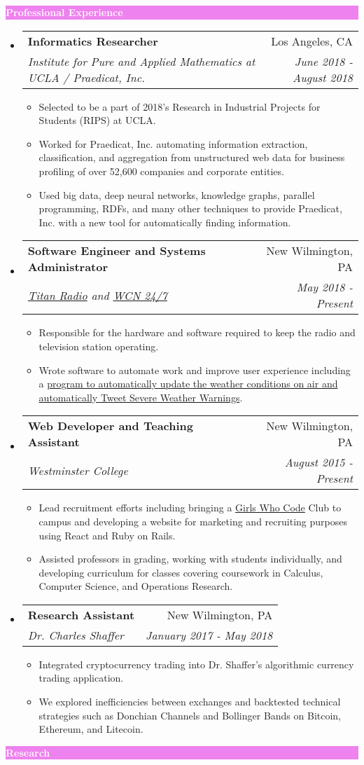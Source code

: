 \documentclass[letterpaper,11pt]{article}
\makeatletter
\newcommand{\resitem}[1]{\item #1 \vspace{-2pt}}
\newcommand{\resheading}[1]{{\large \colorbox{violet}{\begin{minipage}{\textwidth}{\textbf{#1 \vphantom{p\^{E}}}}\end{minipage}}}}
\newcommand{\ressubheading}[4]{
	\begin{tabular*}{7.0in}{l@{\extracolsep{\fill}}r}
		\textbf{#1} & #2 \\
		\textit{#3} & \textit{#4} \\
	\end{tabular*}\vspace{-6pt}}
\makeatother
\begin{document}
	\resheading{\textcolor{white}{Professional Experience}}
	\begin{itemize}[topsep=3pt, itemsep=1pt]
		\item
		\ressubheading{Informatics Researcher}{Los Angeles, CA}{Institute for Pure and Applied Mathematics at UCLA / Praedicat, Inc.}{June 2018 -August 2018}
		\begin{itemize}
			\resitem{Selected to be a part of 2018’s Research in Industrial Projects for Students (RIPS) at UCLA.}
			\resitem{Worked for Praedicat, Inc. automating information extraction, classification, and aggregation from unstructured web data for business profiling of over 52,600 companies and corporate entities.}
			\resitem{Used big data, deep neural networks, knowledge graphs, parallel programming, RDFs, and many other techniques to provide Praedicat, Inc. with a new tool for automatically finding information.}
		\end{itemize}
		\item
		\ressubheading{Software Engineer and Systems Administrator}{New Wilmington, PA}{\href{http://titanradio.net/}{Titan Radio} and \href{https://www.wcn247.com/}{WCN 24/7}}{May 2018 - Present}
		\begin{itemize}
			\resitem{Responsible for the hardware and software required to keep the radio and television station operating.}
			\resitem{Wrote software to automate work and improve user experience including a \href{https://github.com/alexandermichels/WeatherWaves}{program to automatically update the weather conditions on air and automatically Tweet Severe Weather Warnings}.}
		\end{itemize}
		\item
		\ressubheading{Web Developer and Teaching Assistant}{New Wilmington, PA}{Westminster College}{August 2015 - Present}
		\begin{itemize}
			\resitem{Lead recruitment efforts including bringing a \href{https://girlswhocode.com}{Girls Who Code} Club to campus and  developing a website for marketing and recruiting purposes using React and Ruby on Rails.}
			\resitem{Assisted professors in grading, working with students individually, and developing curriculum for classes covering coursework in Calculus, Computer Science, and Operations Research.}
		\end{itemize}
		\item
		\ressubheading{Research Assistant}{New Wilmington, PA}{Dr. Charles Shaffer}{January 2017 - May 2018}
		\begin{itemize}[topsep=3pt, itemsep=1pt]
			\resitem{Integrated cryptocurrency trading into Dr. Shaffer's algorithmic currency trading application.}
			\resitem{We explored inefficiencies between exchanges and backtested technical strategies such as Donchian Channels and Bollinger Bands on Bitcoin, Ethereum, and Litecoin.}
		\end{itemize}
		
	\end{itemize}
	\resheading{\textcolor{white}{Research}}
	
\end{document}
